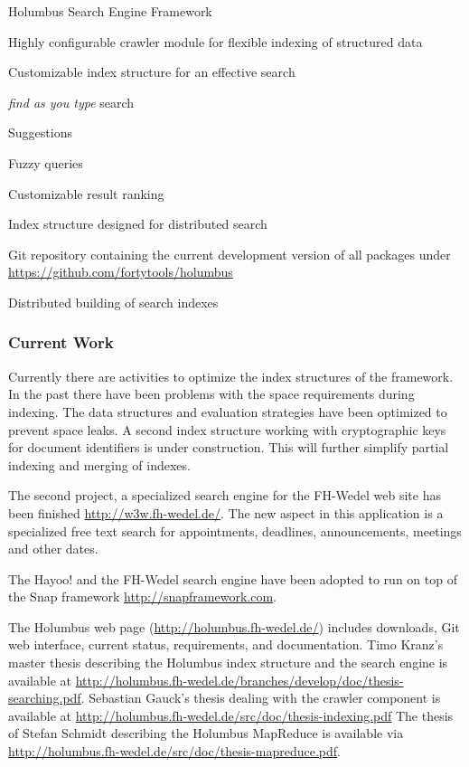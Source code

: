 \begin{hcarentry}[updated]{Holumbus Search Engine Framework}
\begin{compactitem}
\item Highly configurable crawler module for flexible indexing of structured data
\item Customizable index structure for an effective search
\item {\em find as you type} search
\item Suggestions
\item Fuzzy queries
\item Customizable result ranking
\item Index structure designed for distributed search
\item Git repository containing the current development version of all packages under
  \url{https://github.com/fortytools/holumbus}
\item Distributed building of search indexes
\end{compactitem}

\subsubsection*{Current Work}

Currently there are activities to optimize the index structures
of the framework. In the past there have been problems with the
space requirements during indexing. The data structures and evaluation
strategies have been optimized to prevent space leaks. A second index
structure working with cryptographic keys for document identifiers
is under construction. This will further simplify partial indexing and
merging of indexes.

The second project, a specialized search engine for the FH-Wedel web site has been finished
 \url{http://w3w.fh-wedel.de/}. The new aspect in this application is a specialized
free text search for appointments, deadlines,
announcements, meetings and other dates.

The Hayoo! and the FH-Wedel search engine have been adopted to run on top of the
Snap framework \url{http://snapframework.com}.

\FurtherReading

The Holumbus web page
(\url{http://holumbus.fh-wedel.de/})
includes downloads, Git web interface, current status, requirements, 
and documentation.
Timo Kranz's master thesis describing the Holumbus index structure and
the search engine is available at
\url{http://holumbus.fh-wedel.de/branches/develop/doc/thesis-searching.pdf}.
Sebastian Gauck's  thesis dealing with the crawler component is
available at
\url{http://holumbus.fh-wedel.de/src/doc/thesis-indexing.pdf}
The thesis of Stefan Schmidt describing the Holumbus MapReduce is
available via \url{http://holumbus.fh-wedel.de/src/doc/thesis-mapreduce.pdf}.
\end{hcarentry}
